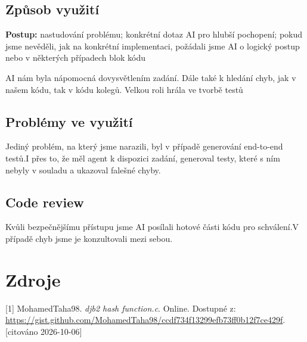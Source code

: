 \documentclass[]{ifjclass}
\begin{document}
        \subsection{Způsob využití}
            \textbf{Postup:} nastudování problému; konkrétní dotaz AI pro hlubší pochopení; pokud jsme nevěděli, jak na konkrétní implementaci, požádali jsme AI o logický postup nebo v některých případech blok kódu
            \par\medskip 
            \noindent AI nám byla nápomocná dovysvětlením zadání. Dále také k hledání chyb, jak v našem kódu, tak v kódu kolegů. Velkou roli hrála ve tvorbě testů
        \subsection{Problémy ve využití}
            Jediný problém, na který jsme narazili, byl v případě generování end-to-end testů.I přes to, že měl agent k dispozici zadání, generoval testy, které s ním nebyly v souladu a ukazoval falešné chyby.
        \subsection{Code review}
            Kvůli bezpečnějšímu přístupu jsme AI posílali hotové části kódu pro schválení.V případě chyb jsme je konzultovali mezi sebou.
    \newpage
    \section{Zdroje}
    [1] MohamedTaha98. \textit{djb2 hash function.c}. Online. Dostupné z: \url{https://gist.github.com/MohamedTaha98/ccdf734f13299efb73ff0b12f7ce429f}. [citováno 2026-10-06]
\end{document}
